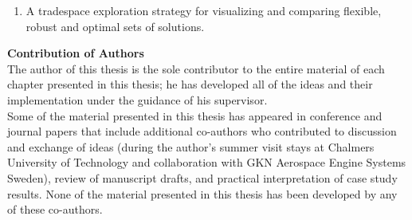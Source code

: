 \documentclass[12pt,Bold,letterpaper,TexShade,twoside]{mcgilletdclass}
\begin{document}
\begin{romanPagenumber}{2}
{\begin{enumerate}
\begin{enumerate}
		\item{A tradespace exploration strategy for visualizing and comparing flexible, robust and optimal sets of solutions.}
	\end{enumerate}
\end{enumerate}
%
\textbf{Contribution of Authors}\\
%
The author of this thesis is the sole contributor to the entire material of each chapter presented in this thesis; he has developed all of the ideas and their implementation under the guidance of his supervisor.\\
%
Some of the material presented in this thesis has appeared in conference and journal papers that include additional co-authors who contributed to discussion and exchange of ideas (during the author's summer visit stays at Chalmers University of Technology and collaboration with GKN Aerospace Engine Systems Sweden), review of manuscript drafts, and practical interpretation of case study results. None of the material presented in this thesis has been developed by any of these co-authors.
}%
\Contribution%


\end{romanPagenumber}
\end{document}

